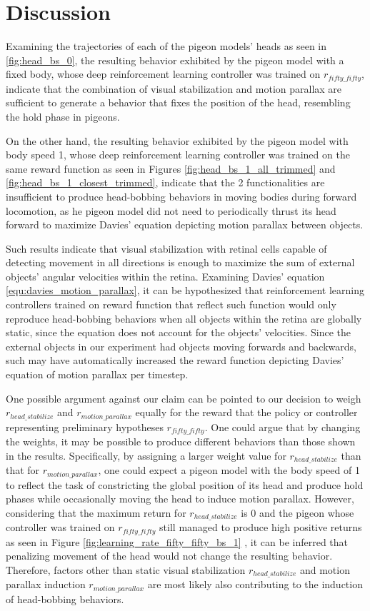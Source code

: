 \chapter{Discussion}
  Examining the trajectories of each of the pigeon models' heads as seen in \ref{fig:head_bs_0}, the resulting behavior exhibited by the pigeon model with a fixed body, whose deep reinforcement learning controller was trained on $r_{fifty\_fifty}$, indicate that the combination of visual stabilization and motion parallax are sufficient to generate a behavior that fixes the position of the head, resembling the hold phase in pigeons.

  On the other hand, the resulting behavior exhibited by the pigeon model with body speed 1, whose deep reinforcement learning controller was trained on the same reward function as seen in Figures \ref{fig:head_bs_1_all_trimmed} and \ref{fig:head_bs_1_closest_trimmed}, indicate that the 2 functionalities are insufficient to produce head-bobbing behaviors in moving bodies during forward locomotion, as he pigeon model did not need to periodically thrust its head forward to maximize Davies' equation depicting motion parallax between objects.

  Such results indicate that visual stabilization with retinal cells capable of detecting movement in all directions is enough to maximize the sum of external objects' angular velocities within the retina.
    Examining Davies' equation \ref{equ:davies_motion_parallax}, it can be hypothesized that reinforcement learning controllers trained on reward function that reflect such function would only reproduce head-bobbing behaviors when all objects within the retina are globally static, since the equation does not account for the objects' velocities.
    Since the external objects in our experiment had objects moving forwards and backwards, such may have automatically increased the reward function depicting Davies' equation of motion parallax per timestep.


  One possible argument against our claim can be pointed to our decision to weigh $r_{head\_stabilize}$ and $r_{motion\_parallax}$ equally for the reward that the policy or controller representing preliminary hypotheses $r_{fifty\_fifty}$. One could argue that by changing the weights, it may be possible to produce different behaviors than those shown in the results.
  Specifically, by assigning a larger weight value for $r_{head\_stabilize}$ than that for $r_{motion\_parallax}$, one could expect a pigeon model with the body speed of 1 to reflect the task of constricting the global position of its head and produce hold phases while occasionally moving the head to induce motion parallax.
  However, considering that the maximum return for $r_{head\_stabilize}$ is 0 and the pigeon whose controller was trained on $r_{fifty\_fifty}$ still managed to produce high positive returns as seen in Figure \ref{fig:learning_rate_fifty_fifty_bs_1} , it can be inferred that penalizing movement of the head would not change the resulting behavior.
  Therefore, factors other than static visual stabilization $r_{head\_stabilize}$ and motion parallax induction $r_{motion\_parallax}$ are most likely also contributing to the induction of head-bobbing behaviors.

